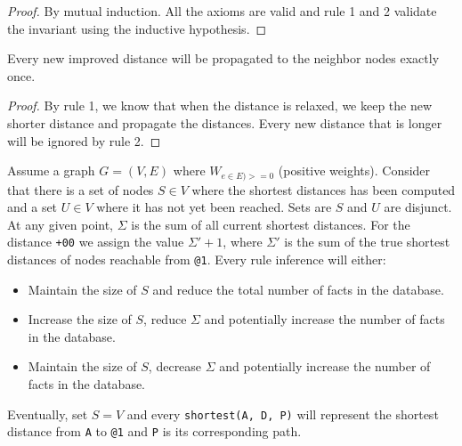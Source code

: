 \begin{proof}
By mutual induction. All the axioms are valid and rule 1 and 2 validate the
invariant using the inductive hypothesis.
\end{proof}

\begin{lemma}[Relaxation]
Every new improved distance will be propagated to the neighbor nodes exactly once.
\end{lemma}
\begin{proof}
By rule 1, we know that when the distance is relaxed, we keep the new shorter
distance and propagate the distances. Every new distance that is longer will be
ignored by rule 2.
\end{proof}

\begin{theorem}[Correctness]

   Assume a graph $G = (V, E)$ where $W_{e \in E) >= 0}$ (positive weights).
   Consider that there is a set of nodes $S \in V$ where the shortest distances
   has been computed and a set $U \in V$ where it has not yet been reached.
   Sets are $S$ and $U$ are disjunct. At any given point, $\Sigma$ is the sum of
   all current shortest distances. For the distance \texttt{+00} we assign the
   value $\Sigma' + 1$, where $\Sigma'$ is the sum of the true shortest
   distances of nodes reachable from \texttt{@1}.  Every rule inference will
   either:

   \begin{itemize}
      \item Maintain the size of $S$ and reduce the total number of facts in
         the database.
      \item Increase the size of $S$, reduce $\Sigma$ and potentially increase the number of
         facts in the database.
      \item Maintain the size of $S$, decrease $\Sigma$
         and potentially increase the number of facts in the database.
   \end{itemize}

   Eventually, set $S = V$ and every \texttt{shortest(A, D, P)} will represent
   the shortest distance from \texttt{A} to \texttt{@1} and \texttt{P} is its
   corresponding path.
\end{theorem}

